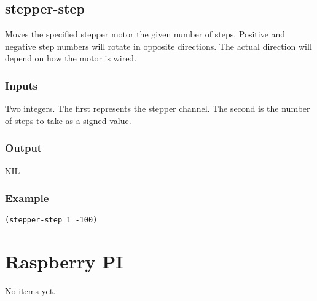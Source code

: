 \documentclass[10pt, openany]{book}
\begin{document}
\section{stepper-step}
Moves the specified stepper motor the given number of steps.  Positive and negative step numbers will rotate in opposite directions.  The actual direction will depend on how the motor is wired.
\subsection{Inputs}
Two integers.  The first represents the stepper channel.  The second is the number of steps to take as a signed value.
\subsection{Output}
NIL
\subsection{Example}
\begin{lstlisting}
(stepper-step 1 -100)
\end{lstlisting}


\chapter{Raspberry PI}
No items yet.
\end{document}
